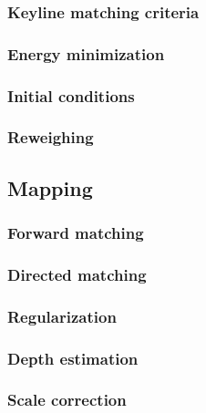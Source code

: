 \subsubsection{Keyline matching criteria}


\subsubsection{Energy minimization}

\subsubsection{Initial conditions}

\subsubsection{Reweighing}


\subsection{Mapping}

\subsubsection{Forward matching}

\subsubsection{Directed matching}

\subsubsection{Regularization}

\subsubsection{Depth estimation}

\subsubsection{Scale correction}